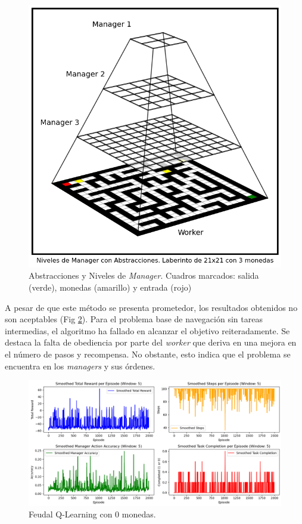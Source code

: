 \documentclass[letterpaper]{article} %
\begin{document}
\begin{figure}[H]
    \centering
    \includegraphics[width=\columnwidth]{abstractions.png}
    \caption{Abstracciones y Niveles de \textit{Manager}. Cuadros marcados: salida (verde), monedas (amarillo) y entrada (rojo) \label{fig:feudal-abstract}}
\end{figure}

A pesar de que este método se presenta prometedor, los resultados obtenidos no son aceptables (Fig \ref{fig:q-orig-results}). Para el 
problema base de navegación sin tareas intermedias, el algoritmo ha fallado en alcanzar el objetivo reiteradamente. Se destaca la falta
de obediencia por parte del \textit{worker} que deriva en una mejora en el número de pasos y recompensa. No obstante, esto indica que el problema 
se encuentra en los \textit{managers} y sus órdenes. 

\begin{figure}[H]
    \centering
    \includegraphics[width=\columnwidth]{q-original-results.png}
    \caption{Feudal Q-Learning con 0 monedas.\label{fig:q-orig-results}}
\end{figure}
\end{document}
